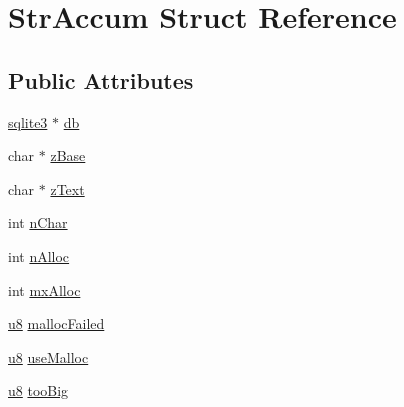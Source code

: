 \hypertarget{struct_str_accum}{\section{Str\-Accum Struct Reference}
\label{struct_str_accum}
}
\subsection*{Public Attributes}
\begin{DoxyCompactItemize}
\item 
\hyperlink{structsqlite3}{sqlite3} $\ast$ \hyperlink{struct_str_accum_ade44091c9a91671c9457b9e4a98a9a5d}{db}
\item 
char $\ast$ \hyperlink{struct_str_accum_a5797e2f288573ee98a4025f0f96fe50d}{z\-Base}
\item 
char $\ast$ \hyperlink{struct_str_accum_ac45a51cb7b85da2ae9865eac21d416dc}{z\-Text}
\item 
int \hyperlink{struct_str_accum_a88bf779588ca597a41fde3e41186e003}{n\-Char}
\item 
int \hyperlink{struct_str_accum_ae2f21c484b737b9903e695977c27815a}{n\-Alloc}
\item 
int \hyperlink{struct_str_accum_ab9985e4aabc65bebbf026881ce0b59bd}{mx\-Alloc}
\item 
\hyperlink{sqlite3_8c_a74a0f6424ae628af25f23f0a35f6ead3}{u8} \hyperlink{struct_str_accum_a6bc89e5ed8495ddcddadf0940f236c84}{malloc\-Failed}
\item 
\hyperlink{sqlite3_8c_a74a0f6424ae628af25f23f0a35f6ead3}{u8} \hyperlink{struct_str_accum_abc135ceee2e63f41c101aceca5e9417b}{use\-Malloc}
\item 
\hyperlink{sqlite3_8c_a74a0f6424ae628af25f23f0a35f6ead3}{u8} \hyperlink{struct_str_accum_ae5b62e58c33302b44fedf0e204757ced}{too\-Big}
\end{DoxyCompactItemize}


